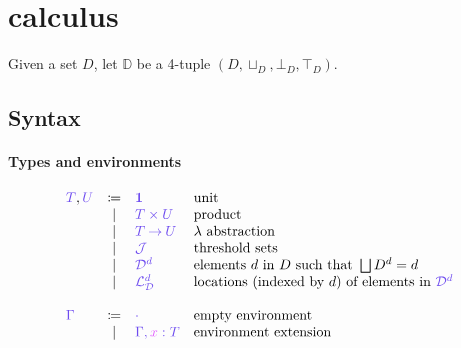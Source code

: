 \documentclass[main.tex]{subfiles}
\begin{document}
\section{\typedlvar calculus}

\begin{definition}[Domains]
  Given a set $D$, let $\mathbb{D}$ be a 4-tuple $(D, \sqcup_{D}, \bot_{D}, \top_{D})$.
\end{definition}

\subsection{Syntax}
\label{sec:llam-syntax}

\paragraph{Types and environments}
\[
\begin{array}{lcll}
  \ty{T}, \ty{U}
  & \coloneqq & \ty{\tyunit}        & \text{unit} \\
  & \sep      & \ty{\typrod{T}{U}}  & \text{product} \\
  & \sep      & \ty{\tyfun{T}{U}}   & \lambda \text{ abstraction}\\
  & \sep      & \ty{\tyJ}         & \text{threshold sets} \\
  & \sep      & \ty{\tyD{d}}        & \text{elements }d\text{ in }D\text{ such that }\bigsqcup{D^d}=d\\
  & \sep      & \ty{\tyL{d}}        & \text{locations (indexed by }d\text{) of elements in }\tyD{d}\\
  \\
  \ty{\Gamma}
  & \coloneqq & \ty{\emptyenv}                 & \text{empty environment}\\
  & \sep      & \ty{\ty{\Gamma},\tmty{x}{T}}   & \text{environment extension} \\
\end{array}
\]
\end{document}
